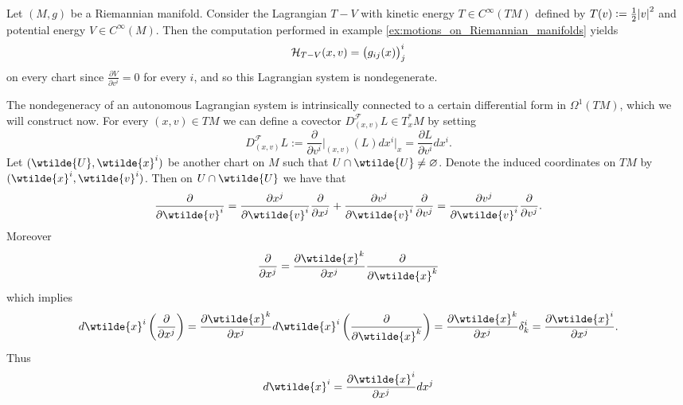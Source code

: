 \begin{example}
	\label{ex:nondegenerate_Lagrangian_system}
	Let $(M,g)$ be a Riemannian manifold. Consider the Lagrangian $T - V$ with kinetic energy $T \in C^\infty(TM)$ defined by $T(v) := \frac{1}{2}\abs{v}^2$ and potential energy $V \in C^\infty(M)$. Then the computation performed in example \ref{ex:motions_on_Riemannian_manifolds} yields
	\begin{equation*}
		\mathcal{H}_{T - V}(x,v) = \del[1]{g_{ij}(x)}^i_j
	\end{equation*} 
	\noindent on every chart since $\frac{\partial V}{\partial v^i} = 0$ for every $i$, and so this Lagrangian system is nondegenerate.
\end{example}

The nondegeneracy of an autonomous Lagrangian system is intrinsically connected to a certain differential form in $\Omega^1(TM)$, which we will construct now. For every $(x,v) \in TM$ we can define a covector $D^\mathcal{F}_{(x,v)} L \in T^*_xM$ by setting
\begin{equation}
	D^\mathcal{F}_{(x,v)}L := \frac{\partial}{\partial v^i}\bigg\vert_{(x,v)}(L) dx^i\vert_x = \frac{\partial L}{\partial v^i}dx^i.
\end{equation}
Let $(\wtilde{U},\wtilde{x}^i)$ be another chart on $M$ such that $U \cap \wtilde{U} \neq \varnothing$. Denote the induced coordinates on $TM$ by $(\wtilde{x}^i,\wtilde{v}^i)$. Then on $U \cap \wtilde{U}$ we have that 
\begin{equation*}
	\frac{\partial}{\partial \wtilde{v}^i} = \frac{\partial x^j}{\partial \wtilde{v}^i}\frac{\partial}{\partial x^j} + \frac{\partial v^j}{\partial \wtilde{v}^i}\frac{\partial}{\partial v^j} = \frac{\partial v^j}{\partial \wtilde{v}^i}\frac{\partial}{\partial v^j}.
\end{equation*}
Moreover
\begin{equation*}
	\frac{\partial}{\partial x^j} = \frac{\partial \wtilde{x}^k}{\partial x^j} \frac{\partial}{\partial \wtilde{x}^k}
\end{equation*}
\noindent which implies
\begin{equation*}
	d\wtilde{x}^i \del[3]{\frac{\partial}{\partial x^j}} = \frac{\partial \wtilde{x}^k}{\partial x^j} d\wtilde{x}^i\del[3]{\frac{\partial}{\partial \wtilde{x}^k}} = \frac{\partial \wtilde{x}^k}{\partial x^j}\delta^i_k = \frac{\partial \wtilde{x}^i}{\partial x^j}.
\end{equation*}
Thus
\begin{equation*}
	d\wtilde{x}^i = \frac{\partial \wtilde{x}^i}{\partial x^j} dx^j
\end{equation*}
